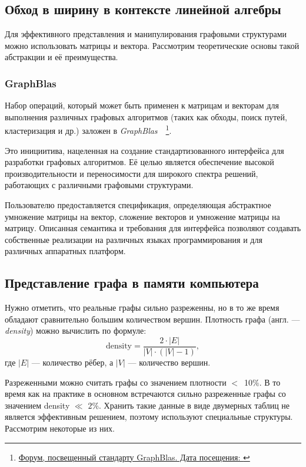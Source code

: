 \subsection{Обход в ширину в контексте линейной алгебры}
\noindent Для эффективного представления и манипулирования графовыми структурами можно использовать матрицы и вектора. Рассмотрим теоретические основы такой абстракции и её преимущества.

\subsubsection*{GraphBlas}
\noindent Набор операций, который может быть применен к матрицам и векторам для выполнения различных графовых алгоритмов (таких как обходы, поиск путей, кластеризация и др.) заложен в \textit{GraphBlas}~\cite{gb_math}~\footnote{\href{https://graphblas.org/}{Форум, посвещенный стандарту GraphBlas. Дата посещения: }}.

Это инициитива, нацеленная на создание стандартизованного интерфейса для разработки графовых алгоритмов. Её целью является обеспечение высокой производительности и переносимости для широкого спектра решений, работающих с различными графовыми структурами.

Пользователю предоставляется спецификация, определяющая абстрактное умножение матрицы на вектор, сложение векторов и умножение матрицы на матрицу. Описанная семантика и требования для интерфейса позволяют создавать собственные реализации на различных языках программирования и для различных аппаратных платформ.

\subsection{Представление графа в памяти компьютера}
\noindent Нужно отметить, что реальные графы сильно разреженны, но в то же время обладают сравнительно большим количеством вершин.
Плотность графа (англ. --- \textit{density}) можно вычислить по формуле:
\begin{equation}
	\label{eq:density}
	\text{density} = \frac{2 \cdot \big| E \big| }{\big| V \big| \cdot (\big| V \big| - 1)},
\end{equation}
где $\big| E \big|$ --- {количество рёбер}, а $\big| V \big|$ --- количество вершин.

Разреженными можно считать графы со значением плотности $<$~10$\%$. В то время как на практике в основном встречаются сильно разреженные графы со значением density $\ll$ $2\%$. Хранить такие данные в виде двумерных таблиц не является эффективным решением, поэтому используют специальные структуры. Рассмотрим некоторые из них.

